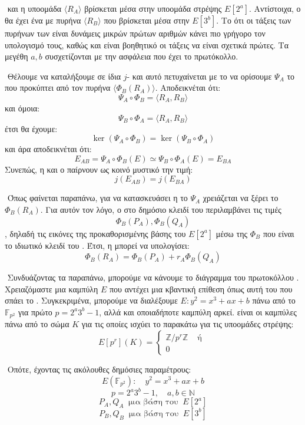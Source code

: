 \documentclass[oneside,a4paper]{article}
\begin{document}
$ $\newline
και η υποομάδα $\langle R_A \rangle$ βρίσκεται μέσα στην υποομάδα στρέψης $E[2^a]$. Αντίστοιχα, ο  θα έχει ένα  με πυρήνα $\langle R_B \rangle$ που βρίσκεται μέσα στην $E[3^b]$. Το ότι οι τάξεις των πυρήνων των  είναι δυνάμεις μικρών πρώτων αριθμών κάνει πιο γρήγορο τον υπολογισμό τους, καθώς και είναι βοηθητικό οι τάξεις να είναι σχετικά πρώτες. Τα μεγέθη $a,b$ συσχετίζονται με την ασφάλεια που έχει το πρωτόκολλο.


$ $\newline
Θέλουμε να καταλήξουμε σε ίδια $j$- και αυτό πετυχαίνεται με το να ορίσουμε $\Psi_A$ το  που προκύπτει από τον πυρήνα $\langle \Phi_B(R_A) \rangle$. Αποδεικνέται ότι:
$$\Psi_A \circ \Phi_B = \langle R_A, R_B \rangle$$ και όμοια:
$$\Psi_B \circ \Phi_A = \langle R_A, R_B \rangle$$ έτσι θα έχουμε:
$$\ker (\Psi_A \circ \Phi_B) = \ker (\Psi_B \circ \Phi_A)$$ και άρα αποδεικνέται ότι:
$$E_{AB} = \Psi_A \circ \Phi_B(E) \simeq \Psi_B \circ \Phi_A (E) = E_{BA}$$ Συνεπώς, η  και ο  παίρνουν ως κοινό μυστικό την τιμή:
$$j(E_{AB}) = j(E_{BA})$$

$ $\newline
Όπως φαίνεται παραπάνω, για να κατασκευάσει η  το $\Psi_A$ χρειάζεται να ξέρει το $\Phi_B(R_A)$. Για αυτόν τον λόγο, ο  στο δημόσιο κλειδί του περιλαμβάνει τις τιμές $$\Phi_B(P_A), \Phi_B(Q_A)$$, δηλαδή τις εικόνες της προκαθορισμένης βάσης του $E[2^a]$ μέσω της $\Phi_B$ που είναι το ιδιωτικό κλειδί του . Έτσι, η  μπορεί να υπολογίσει:
$$\Phi_B(R_A) =  \Phi_B(P_A) + r_A \Phi_B(Q_A)$$

$ $\newline
Συνδυάζοντας τα παραπάνω, μπορούμε να κάνουμε το διάγραμμα του πρωτοκόλλου . Χρειαζόμαστε μια καμπύλη $E$ που αντέχει μια κβαντική επίθεση όπως αυτή του  που σπάει το . Συγκεκριμένα, μπορούμε να διαλέξουμε $E: y^2 = x^3 +ax+b$ πάνω από το $\mathbb{F}_{p^2}$ για πρώτο $p=2^a 3^b -1$, αλλά και οποιαδήποτε  καμπύλη αρκεί.  είναι οι καμπύλες πάνω από το σώμα $K$ για τις οποίες ισχύει το παρακάτω για τις υποομάδες στρέψης:
$$E[p^r](K) = \begin{cases}
	\mathbb{Z}/p^r \mathbb{Z} & \text{ ή }\\
	0
\end{cases}$$ 

$ $\newline
Οπότε, έχοντας τις ακόλουθες δημόσιες παραμέτρους:
$$E(\mathbb{F}_{p^2}): \quad y^2=x^3+ax+b$$
$$p = 2^a 3^b -1, \quad a,b \in \mathbb{N}$$
$$P_A, Q_A \ \text{ μια βάση του } \ E[2^a]$$
$$P_B, Q_B \ \text{ μια βάση του } \ E[3^b]$$
\end{document}
